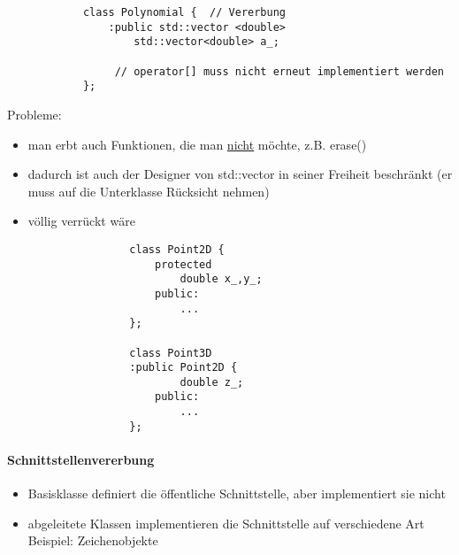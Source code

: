 \documentclass{article}
\begin{document}
\begin{itemize}
\begin{lstlisting}
			class Polynomial {  // Vererbung
				:public std::vector <double>
					std::vector<double> a_;
				
				 // operator[] muss nicht erneut implementiert werden
			};
		\end{lstlisting}
		Probleme:
		\begin{itemize}
			\item man erbt auch Funktionen, die man \underline{nicht} möchte, z.B. erase()
			\item dadurch ist auch der Designer von std::vector in seiner Freiheit beschränkt (er muss auf die Unterklasse Rücksicht nehmen)
			\item völlig verrückt wäre
			\begin{lstlisting}
				class Point2D {
					protected
						double x_,y_;
					public:
						...
				};

				class Point3D
				:public Point2D {
						double z_;
					public:
						...
				};
			\end{lstlisting}
		\end{itemize}

	\paragraph*{Schnittstellenvererbung}
		\begin{itemize}
			\item Basisklasse definiert die öffentliche Schnittstelle, aber implementiert sie nicht
			\item abgeleitete Klassen implementieren die Schnittstelle auf verschiedene Art \\ Beispiel: Zeichenobjekte \\ \\
\end{itemize}
\end{itemize}
\end{document}
